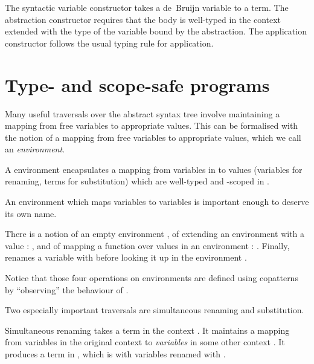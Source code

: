 \documentclass[bsc,frontabs,oneside,singlespacing,parskip,deptreport]{infthesis}
\theoremstyle{definition}
\theoremstyle{lemma}
\begin{document}

The syntactic variable  constructor takes a de~Bruijn variable to
a term. The abstraction constructor  requires that the body is
well-typed in the context  extended with the type  of the
variable bound by the abstraction. The application constructor
 follows the usual typing rule for application.

\section{Type- and scope-safe programs}
\label{sec:typ-scop-saf-prog}

Many useful traversals over the abstract syntax tree involve
maintaining a mapping from free variables to appropriate values. This
can be formalised with the notion of a mapping from free variables to
appropriate values, which we call an \textit{environment}.


A environment  encapsulates a mapping from variables in
 to values  (variables for renaming, terms for
substitution) which are well-typed and -scoped in .

An environment which maps variables to variables is important enough
to deserve its own name.


There is a notion of an empty environment , of extending an
environment  with a value : , and of mapping a
function  over values in an environment : . Finally,  renames a variable with 
before looking it up in the environment .


Notice that those four operations on environments are defined using
copatterns \cite{DBLP:conf/popl/AbelPTS13} by ``observing'' the
behaviour of .

Two especially important traversals are simultaneous renaming and
substitution.

Simultaneous renaming takes a term  in the context . It maintains
a mapping  from variables in the original context  to
\textit{variables} in some other context . It produces a term in
, which is  with variables renamed with .
\end{document}
